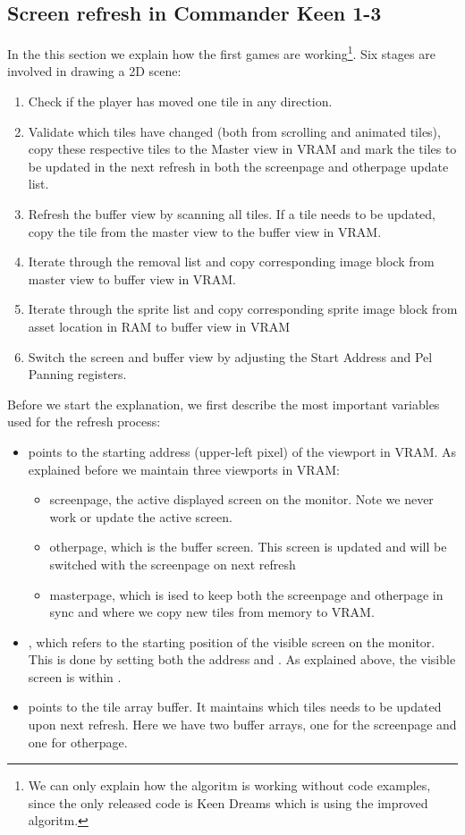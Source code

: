 \documentclass[book.tex]{subfiles}
\begin{document}
\subsection{Screen refresh in Commander Keen 1-3}
In the this section we explain how the first games are working\footnote{We can only explain how the algoritm is working without code examples, since the only released code is Keen Dreams which is using the improved algoritm.}. Six stages are involved in drawing a 2D scene:
\begin{enumerate}
\item Check if the player has moved one tile in any direction.
\item Validate which tiles have changed (both from scrolling and animated tiles), copy these respective tiles to the Master view in VRAM and mark the tiles to be updated in the next refresh in both the screenpage and otherpage update list.
\item Refresh the buffer view by scanning all tiles. If a tile needs to be updated, copy the tile from the master view to the buffer view in VRAM.
\item Iterate through the removal list and copy corresponding image block from master view to buffer view in VRAM. 
\item Iterate through the sprite list and copy corresponding sprite image block from asset location in RAM to buffer view in VRAM
\item Switch the screen and buffer view by adjusting the Start Address and Pel Panning registers.
\end{enumerate}

Before we start the explanation, we first describe the most important variables used for the refresh process:
\begin{itemize}
  \item {} points to the starting address (upper-left pixel) of the viewport in VRAM. As explained before we maintain three viewports in VRAM:
  \begin{itemize}
    \item screenpage, the active displayed screen on the monitor. Note we never work or update the active screen.
    \item otherpage, which is the buffer screen. This screen is updated and will be switched with the screenpage on next refresh
    \item masterpage, which is ised to keep both the screenpage and otherpage in sync and where we copy new tiles from memory to VRAM.
  \end{itemize}
  \item {}, which refers to the starting position of the visible screen on the monitor. This is done by setting both the  address and . As explained above, the visible screen is within . 
  \item {} points to the tile array buffer. It maintains which tiles needs to be updated upon next refresh. Here we have two buffer arrays, one for the screenpage and one for otherpage.
\end{itemize}
\end{document}
